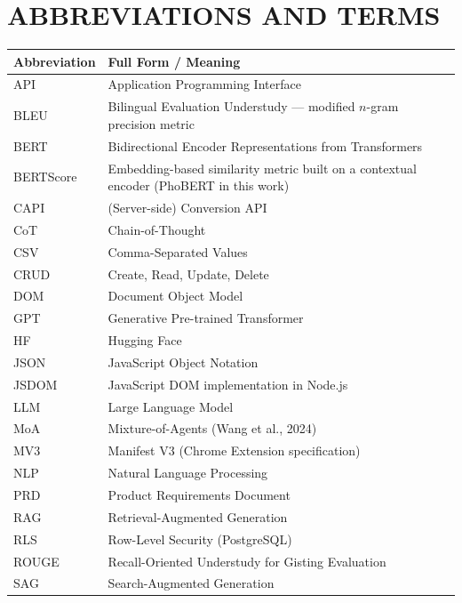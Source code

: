 \chapter*{ABBREVIATIONS AND TERMS}

\begin{longtable}{|>{\raggedright\arraybackslash}p{3.6cm}|>{\raggedright\arraybackslash}p{10.4cm}|}
  \hline
  \textbf{Abbreviation} & \textbf{Full Form / Meaning} \\
  \hline
  API   & Application Programming Interface \\ \hline
  BLEU  & Bilingual Evaluation Understudy --- modified $n$-gram precision metric \\ \hline
  BERT  & Bidirectional Encoder Representations from Transformers \\ \hline
  BERTScore & Embedding-based similarity metric built on a contextual encoder (PhoBERT in this work) \\ \hline
  CAPI  & (Server-side) Conversion API \\ \hline
  CoT   & Chain-of-Thought \\ \hline
  CSV   & Comma-Separated Values \\ \hline
  CRUD  & Create, Read, Update, Delete \\ \hline
  DOM   & Document Object Model \\ \hline
  GPT   & Generative Pre-trained Transformer \\ \hline
  HF    & Hugging Face \\ \hline
  JSON  & JavaScript Object Notation \\ \hline
  JSDOM & JavaScript DOM implementation in Node.js \\ \hline
  LLM   & Large Language Model \\ \hline
  MoA   & Mixture-of-Agents (Wang et al., 2024) \\ \hline
  MV3   & Manifest V3 (Chrome Extension specification) \\ \hline
  NLP   & Natural Language Processing \\ \hline
  PRD   & Product Requirements Document \\ \hline
  RAG   & Retrieval-Augmented Generation \\ \hline
  RLS   & Row-Level Security (PostgreSQL) \\ \hline
  ROUGE & Recall-Oriented Understudy for Gisting Evaluation \\ \hline
  SAG   & Search-Augmented Generation \\ \hline

\end{longtable}
